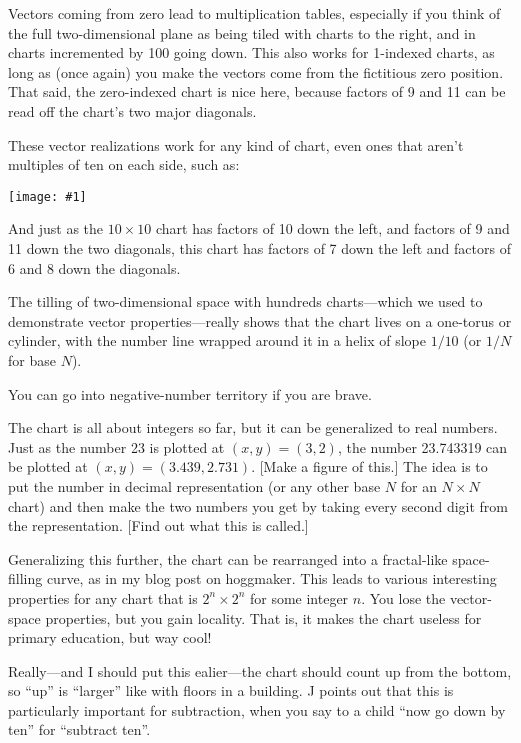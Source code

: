 \documentclass[12pt,pdftex]{article}
\newcommand{\showchart}[1]{\texttt{[image: \#1]}}
\begin{document}
Vectors coming from zero lead to multiplication tables, especially if
you think of the full two-dimensional plane as being tiled with charts
to the right, and in charts incremented by 100 going down.  This also
works for 1-indexed charts, as long as (once again) you make the
vectors come from the fictitious zero position.  That said, the
zero-indexed chart is nice here, because factors of 9 and 11 can be
read off the chart's two major diagonals.

These vector realizations work for any kind of chart, even ones that
aren't multiples of ten on each side, such as:
\begin{center}
\showchart{hundreds_chart_7x7_base10.pdf}
\end{center}
And just as the $10\times 10$ chart has factors of 10 down the left,
and factors of 9 and 11 down the two diagonals, this chart has factors
of 7 down the left and factors of 6 and 8 down the diagonals.

The tilling of two-dimensional space with hundreds charts---which we
used to demonstrate vector properties---really shows that the chart
lives on a one-torus or cylinder, with the number line wrapped around
it in a helix of slope $1/10$ (or $1/N$ for base $N$).

You can go into negative-number territory if you are brave.

The chart is all about integers so far, but it can be generalized to
real numbers.  Just as the number 23 is plotted at $(x,y) = (3,2)$,
the number 23.743319 can be plotted at $(x,y) = (3.439, 2.731)$.
[Make a figure of this.]  The idea is to put the number in decimal
representation (or any other base $N$ for an $N\times N$ chart) and
then make the two numbers you get by taking every second digit from
the representation.  [Find out what this is called.]

Generalizing this further, the chart can be rearranged into a
fractal-like space-filling curve, as in my blog post on hoggmaker.
This leads to various interesting properties for any chart that is
$2^n\times 2^n$ for some integer $n$.  You lose the vector-space
properties, but you gain locality.  That is, it makes the chart
useless for primary education, but way cool!

Really---and I should put this ealier---the chart should count up from
the bottom, so ``up'' is ``larger'' like with floors in a building.  J
points out that this is particularly important for subtraction, when
you say to a child ``now go down by ten'' for ``subtract ten''.
\end{document}
